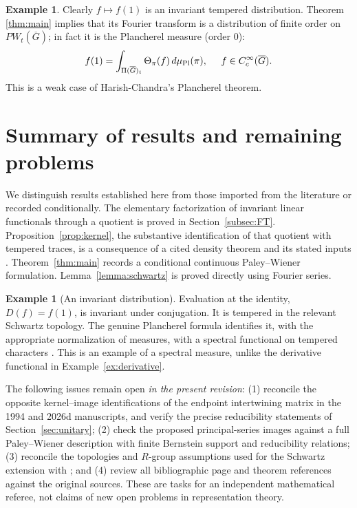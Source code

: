 \documentclass[12pt,letterpaper]{article}
\theoremstyle{definition}
\newtheorem{example}[theorem]{Example}
\theoremstyle{remark}
\begin{document}
\begin{example}
 Clearly $f\longmapsto f(1)$ is an invariant tempered distribution.
Theorem \ref{thm:main} implies that its Fourier transform is a distribution of finite order on
$PW_t(\overline{G})$; in fact it is the Plancherel measure (order $0$):
\[
f(1)=\int_{\Pi(\overline{G })_t }
\Theta _\pi (f)\,d\mu_{\rm Pl}(\pi ),\;\;\;\;\;f\in 
C_c^\infty(\overline{G }). 
\]
This is a weak case of Harish-Chandra's Plancherel theorem.
\end{example}


\section{Summary of results and remaining problems}\label{sec:summary}
We distinguish results established here from those imported from the
literature or recorded conditionally.  The elementary factorization of
invariant linear functionals through a quotient is proved in
Section~\ref{subsec:FT}.  Proposition~\ref{prop:kernel}, the
substantive identification of that quotient with tempered traces,
is a consequence of a cited density theorem and its stated inputs
\cite[Theorem~5.8.10]{Li12}.  Theorem~\ref{thm:main} records a
conditional continuous Paley--Wiener formulation.  Lemma~\ref{lemma:schwartz}
is proved directly using Fourier series.

\begin{example}[An invariant distribution]\label{ex:identity}
Evaluation at the identity, $D(f)=f(1)$, is invariant under
conjugation.  It is tempered in the relevant Schwartz topology.
The genuine Plancherel formula identifies it, with the appropriate
normalization of measures, with a spectral functional on tempered
characters \cite[Section~2]{Li12}.  This is an example of a
spectral measure, unlike the derivative functional in
Example~\ref{ex:derivative}.
\end{example}

The following issues remain open \emph{in the present revision}:
(1) reconcile the opposite kernel--image identifications of the
endpoint intertwining matrix in the 1994 and 2026d manuscripts, and
verify the precise reducibility statements of Section~\ref{sec:unitary};
(2) check the proposed principal-series images against a full
Paley--Wiener description with finite Bernstein support and
reducibility relations;
(3) reconcile the topologies and $R$-group assumptions used for the
Schwartz extension with \cite{Li12}; and
(4) review all bibliographic page and theorem references against the
original sources.  These are tasks for an independent mathematical
referee, not claims of new open problems in representation theory.
\end{document}
